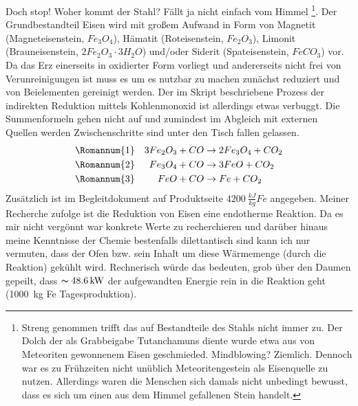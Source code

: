 Doch stop! Woher kommt der Stahl? Fällt ja nicht einfach vom Himmel \footnote[1]{Streng genommen trifft das auf Bestandteile
des Stahls nicht immer zu. Der Dolch der als Grabbeigabe Tutanchamuns diente wurde etwa aus von Meteoriten gewonnenem Eisen
geschmieded. Mindblowing? Ziemlich. Dennoch war es zu Frühzeiten nicht unüblich Meteoritengestein als Eisenquelle zu nutzen.
Allerdings waren die Menschen sich damals nicht unbedingt bewusst, dass es sich um einen aus dem Himmel gefallenen Stein handelt.}.
Der Grundbestandteil Eisen wird mit großem Aufwand in Form von Magnetit (Magneteisenstein, \(Fe_3 O_4\)), Hämatit
(Roteisenstein, \(Fe_2 O_3\)), Limonit (Brauneisenstein, \(2Fe_2 O_3 \cdot 3H_2 O\)) und/oder Siderit (Spateisenstein,
\(FeCO_3\)) vor. Da das Erz einerseits in oxidierter Form vorliegt und andererseits nicht frei von Verunreinigungen ist
muss es um es nutzbar zu machen zunächst reduziert und von Beielementen gereinigt werden. Der im Skript beschriebene
Prozess der indirekten Reduktion mittels Kohlenmonoxid ist allerdings etwas verbuggt. Die Summenformeln gehen nicht auf
und zumindest im Abgleich mit externen Quellen werden Zwischenschritte sind unter den Tisch fallen gelassen.
\begin{align}
    &\text{\Romannum{1}} &3Fe_2 O_3 + CO &\rightarrow 2Fe_3 O_4 + CO_2\\
    &\text{\Romannum{2}} &Fe_3 O_4 + CO &\rightarrow 3FeO + CO_2\\
    &\text{\Romannum{3}} &FeO + CO &\rightarrow Fe + CO_2
\end{align}
Zusätzlich ist im Begleitdokument auf Produktseite \(\SI[]{4200}{\frac{kJ}{kg}}Fe\) angegeben. Meiner Recherche zufolge ist
die Reduktion von Eisen eine endotherme Reaktion. Da es mir nicht vergönnt war konkrete Werte zu recherchieren und darüber hinaus meine
Kenntnisse der Chemie bestenfalls dilettantisch sind kann ich nur vermuten, dass der Ofen bzw. sein Inhalt um diese
Wärmemenge (durch die Reaktion) gekühlt wird. Rechnerisch würde das bedeuten, grob über den Daumen gepeilt, dass \(\thicksim \SI[]{48,6}{kW}\)
der aufgewandten Energie rein in die Reaktion geht (\SI[]{1000}{kg} Fe Tagesproduktion).
